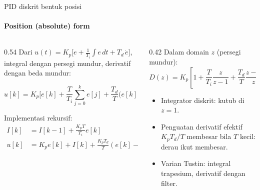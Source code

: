 \documentclass[aspectratio=169,10pt]{beamer}
\begin{document}
\begin{frame}{PID diskrit bentuk posisi}
	\framesubtitle{Position (absolute) form}
	\begin{columns}[T]
		\begin{column}{0.54\textwidth}
			\small
			Dari $u(t) = K_p\big[e + \frac{1}{T_i}\int e\,dt + T_d\,\dot e\big]$, integral dengan persegi mundur, derivatif dengan beda mundur:
			\begin{block}{}
				\[
					u[k] = K_p\Big[e[k] + \frac{T}{T_i}\sum_{j=0}^{k} e[j] + \frac{T_d}{T}\big(e[k]-e[k-1]\big)\Big]
				\]
			\end{block}
			Implementasi rekursif:
			\begin{align*}
				I[k] &= I[k-1] + \frac{K_pT}{T_i}e[k]\\
				u[k] &= K_pe[k] + I[k] + \frac{K_pT_d}{T}(e[k]-e[k-1])
			\end{align*}
		\end{column}
		\begin{column}{0.42\textwidth}
			\small
			Dalam domain $z$ (persegi mundur):
			\[
				D(z) = K_p\left[1 + \frac{T}{T_i}\frac{z}{z-1} + \frac{T_d}{T}\frac{z-1}{z}\right]
			\]
			\begin{itemize}
				\item Integrator diskrit: kutub di $z=1$.
				\item Penguatan derivatif efektif $K_pT_d/T$ \alert{membesar bila $T$ kecil}: derau ikut membesar.
				\item Varian Tustin: integral trapesium, derivatif dengan filter.
			\end{itemize}
		\end{column}
	\end{columns}
\end{frame}
\end{document}
